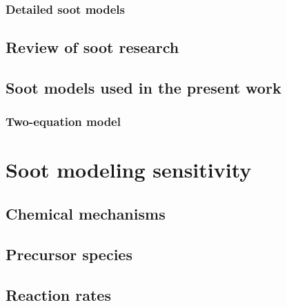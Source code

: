 \subsubsection{Detailed soot models}



\subsection{Review of soot research}



\subsection{Soot models used in the present work} \label{2Eq_sootModel}

\subsubsection{Two-equation model} 
  
  
  
\section{Soot modeling sensitivity}

\subsection{Chemical mechanisms}


\subsection{Precursor species}



\subsection{Reaction rates}
